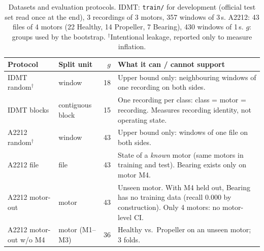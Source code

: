 
\begin{table}[t]
\centering
\scriptsize
\setlength{\tabcolsep}{3pt}
\caption{Datasets and evaluation protocols. IDMT: \texttt{train/} for development (official test set read once at the end), 3 recordings of 3 motors, 357 windows of 3\,s. A2212: 43 files of 4 motors (22 Healthy, 14 Propeller, 7 Bearing), 430 windows of 1\,s. $g$: groups used by the bootstrap. $^\dagger$Intentional leakage, reported only to measure inflation.}
\label{tab:protocols}
\begin{tabular}{@{}p{1.55cm}p{1.35cm}r p{3.75cm}@{}}
\toprule
Protocol & Split unit & $g$ & What it can / cannot support \\
\midrule
IDMT random$^\dagger$ & window & 18 & Upper bound only: neighbouring windows of one recording on both sides. \\
IDMT blocks & contiguous block & 15 & One recording per class: class = motor = recording. Measures recording identity, not operating state. \\
A2212 random$^\dagger$ & window & 43 & Upper bound only: windows of one file on both sides. \\
A2212 file & file & 43 & State of a \emph{known} motor (same motors in training and test). Bearing exists only on motor M4. \\
A2212 motor-out & motor & 43 & Unseen motor. With M4 held out, Bearing has no training data (recall 0.000 by construction). Only 4 motors: no motor-level CI. \\
A2212 motor-out w/o M4 & motor (M1--M3) & 36 & Healthy vs.\ Propeller on an unseen motor; 3 folds. \\
\bottomrule
\end{tabular}
\end{table}
